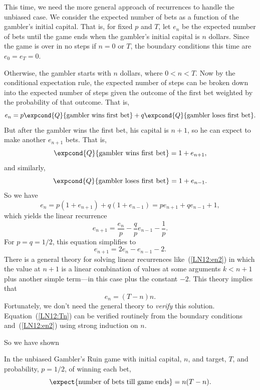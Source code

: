 \begin{editingnotes}
This time, we need the more general approach of recurrences to handle the
unbiased case.  We consider the expected number of bets as a
function of the gambler's initial capital.  That is, for fixed $p$ and $T$,
let $e_n$ be the expected number of bets until the game ends when the
gambler's initial capital is $n$ dollars.  Since the game is over in no
steps if $n=0$ or $T$, the boundary conditions this time are $e_0=e_T=0$.

Otherwise, the gambler starts with $n$ dollars, where $0 < n < T$.
Now by the conditional expectation rule, the expected number of steps can
be broken down into the expected number of steps given the outcome of the
first bet weighted by the probability of that outcome.  That is,
\[
e_n = p\expcond{Q}{\text{gambler wins first bet}} +
q\expcond{Q}{\text{gambler loses first bet}}.
\]
But after the gambler wins the first bet, his capital is $n+1$, so
he can expect to make another $e_{n+1}$ bets.  That is,
\[
\expcond{Q}{\text{gambler wins first bet}} = 1 + e_{n+1},
\]
and similarly, 
\[
\expcond{Q}{\text{gambler loses first bet}} = 1 + e_{n-1}.
\]
So we have
\[
e_n =  p(1 + e_{n+1}) +  q(1 + e_{n-1}) =  pe_{n+1} + qe_{n-1} + 1, 
\]
which yields the linear recurrence
\[
e_{n+1} = \frac{e_n}{p} - \frac{q}{p} e_{n-1} - \frac{1}{p}.
\]
For $p = q = 1/2$, this equation simplifies to
\begin{equation}\label{LN12:en2}
e_{n+1} = 2e_n - e_{n-1} - 2.
\end{equation}
There is a general theory for solving linear recurrences like~(\ref{LN12:en2})
in which the value at $n+1$ is a linear combination of values at some
arguments $k<n+1$ plus another simple term---in this case plus the constant
$-2$.  This theory implies that
\begin{equation}\label{LN12:Tn}
e_n  = (T - n)n.
\end{equation}
Fortunately, we don't need the general theory to \emph{verify} this
solution.  Equation~(\ref{LN12:Tn}) can be verified routinely from the boundary
conditions and~(\ref{LN12:en2}) using strong induction on $n$.

So we have shown
\begin{theorem}\label{LN12:fairtime}
In the unbiased Gambler's Ruin game with initial capital, $n$, and target,
$T$, and probability, $p = 1/2$, of winning each bet,
\begin{equation}
\expect{\text{number of bets till game ends}} = n(T-n).
\end{equation}
\end{theorem}


\end{editingnotes}
